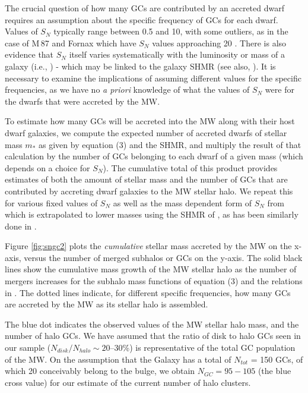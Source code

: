 \documentclass[useAMS,usenatbib]{mn2e}
\begin{document}
The crucial question of how many GCs are contributed by an accreted dwarf
requires an assumption about the specific frequency of GCs for each dwarf.
Values of $S_{N}$ typically range between 0.5 and 10, with some outliers, as in
the case of M$\,$87 and Fornax which have $S_{N}$ values approaching 20
\citep{Mateo98,Peng08}.  There is also evidence that $S_{N}$ itself varies
systematically with the luminosity or mass of a galaxy (i.e., \citealt{Peng08}) -
which may be linked to the galaxy SHMR (see also, \citealt{Spitler09}).
It is necessary to examine the implications of assuming different values 
for the specific frequencies, as we have no {\it a priori} knowledge 
of what the values of $S_{N}$ were for the dwarfs that were accreted by the MW.

To estimate how many GCs will be accreted into the MW along with their host
dwarf galaxies, we compute the expected number of accreted dwarfs of stellar 
mass $m_{*}$ as given by equation (3) and the SHMR, 
and multiply the result of that calculation by the number of
GCs belonging to each dwarf of a given mass (which depends on a choice for
$S_{N}$). The cumulative total of this product
provides estimates of both the amount of stellar mass and the number of GCs 
that are contributed by accreting dwarf galaxies to the MW stellar halo.
We repeat this for various fixed values of $S_{N}$ as well as the 
mass dependent form of $S_{N}$ from \cite{Peng08} which is extrapolated
 to lower masses using the SHMR of \cite{Leauthaud12},
 as has been similarly done in \cite{Spitler09}.

Figure \ref{fig:sngc2} plots the \emph{cumulative} stellar mass accreted by
the MW on the x-axis, versus the number of merged subhalos or GCs on the y-axis.
The solid black lines show the cumulative mass growth of the MW stellar halo as
the number of mergers increases for the subhalo mass functions of equation (3)
and the relations in \cite{BK10}.  The dotted lines indicate, for different specific
frequencies, how many GCs are accreted by the MW as its stellar halo is
assembled.%

The blue dot indicates the observed values of the MW stellar halo mass, and the
number of halo GCs.  We have assumed that the ratio of disk to halo GCs seen in
our sample ($N_{disk}/N_{halo} \sim 20$--30\%) is representative of the total
GC population of the MW.  On the assumption that the Galaxy has a total of
$N_{tot}$ = 150 GCs, of which 20 conceivably belong to the bulge, we obtain
$N_{GC} = 95-105$ (the blue cross value) for our estimate of the current number
of halo clusters.
\end{document}
